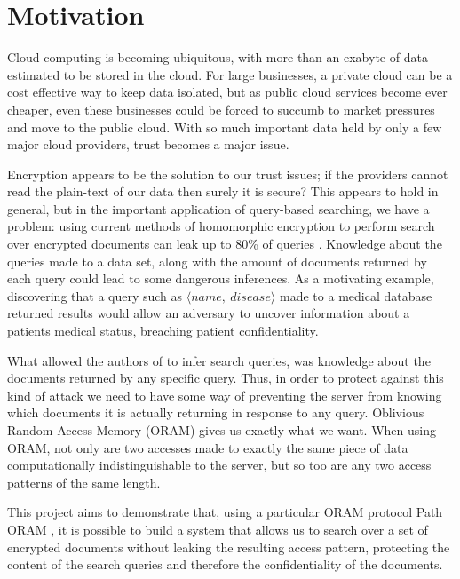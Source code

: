 \documentclass[12pt,a4paper,twoside,openright]{report}
\begin{document}


\section{Motivation}

Cloud computing is becoming ubiquitous, with more than an exabyte of data estimated to be stored in the cloud. For large businesses, a private cloud can be a cost effective way to keep data isolated, but as public cloud services become ever cheaper, even these businesses could be forced to succumb to market pressures and move to the public cloud. With so much important data held by only a few major cloud providers, trust becomes a major issue.

Encryption appears to be the solution to our trust issues; if the providers cannot read the plain-text of our data then surely it is secure? This appears to hold in general, but in the important application of query-based searching, we have a problem: using current methods of homomorphic encryption to perform search over encrypted documents can leak up to 80\% of queries \cite{islam2012access}. Knowledge about the queries made to a data set, along with the amount of documents returned by each query could lead to some dangerous inferences. As a motivating example, discovering that a query such as $\langle name,~disease\rangle$ made to a medical database returned results would allow an adversary to uncover information about a patients medical status, breaching patient confidentiality.

What allowed the authors of \cite{islam2012access} to infer search queries, was knowledge about the documents returned by any specific query. Thus, in order to protect against this kind of attack we need to have some way of preventing the server from knowing which documents it is actually returning in response to any query. Oblivious Random-Access Memory (ORAM) gives us exactly what we want. When using ORAM, not only are two accesses made to exactly the same piece of data computationally indistinguishable to the server, but so too are any two access patterns of the same length.

This project aims to demonstrate that, using a particular ORAM protocol Path ORAM \cite{stefanov2013path}, it is possible to build a system that allows us to search over a set of encrypted documents without leaking the resulting access pattern, protecting the content of the search queries and therefore the confidentiality of the documents.
\end{document}
